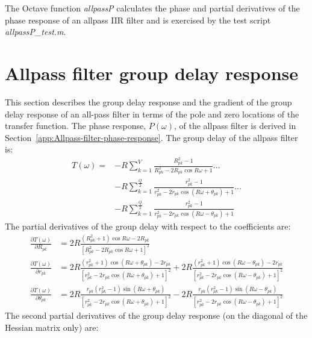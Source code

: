 \documentclass[a4paper,twoside,10pt,english]{report}
\begin{document}
The Octave function \emph{allpassP}
calculates the phase and partial derivatives of the phase response of an allpass
IIR filter and is exercised by the test script \emph{allpassP\_test.m}.
\section{\label{app:Allpass-filter-delay-response}Allpass filter group delay response}
This section describes the group delay response and the gradient of the group 
delay response of an all-pass filter in terms of the pole and zero locations of 
the transfer function. The phase response, $P\left(\omega\right)$, of the allpass
filter is derived in Section~\ref{app:Allpass-filter-phase-response}. The group
delay of the allpass filter is:
\begin{align*}
T\left(\omega\right) =
&-R\sum_{k=1}^{V}\frac{R_{pk}^{2}-1}{R_{pk}^{2}-2R_{pk}\cos R\omega+1} \hdots \\
&-R\sum_{k=1}^{\frac{Q}{2}}\frac{r_{pk}^{2}-1}
{r_{pk}^{2}-2r_{pk}\cos\left( R\omega+\theta_{pk}\right)+1} \hdots \\
&-R\sum_{k=1}^{\frac{Q}{2}}\frac{r_{pk}^{2}-1}
{r_{pk}^{2}-2r_{pk}\cos\left( R\omega-\theta_{pk}\right)+1}
\end{align*}
The partial derivatives of the group delay with respect to the coefficients are:
\begin{align*}
\frac{\partial T\left(\omega\right)}{\partial R_{pk}} &=
2R\frac{\left(R_{pk}^{2}+1\right)\cos R\omega -2R_{pk}}
{\left[R_{pk}^{2}-2R_{pk}\cos R\omega+1\right]^{2}}\\
\frac{\partial T\left(\omega\right)}{\partial r_{pk}} &=
2R\frac{\left(r_{pk}^{2}+1\right)\cos\left(R\omega+\theta_{pk}\right) -2r_{pk}}
{\left[r_{pk}^{2}-2r_{pk}\cos\left(R\omega+\theta_{pk}\right) +1\right]^{2}}+
2R\frac{\left(r_{pk}^{2}+1\right)\cos\left(R\omega-\theta_{pk}\right) -2r_{pk}}
{\left[r_{pk}^{2}-2r_{pk}\cos\left(R\omega-\theta_{pk}\right) +1\right]^{2}}\\
\frac{\partial T\left(\omega\right)}{\partial \theta_{pk}} &=
2R\frac{r_{pk}\left(r_{pk}^{2}-1\right)\sin\left(R\omega+\theta_{pk}\right)}
{\left[r_{pk}^{2}-2r_{pk}\cos\left(R\omega+\theta_{pk}\right) +1\right]^{2}}-
2R\frac{r_{pk}\left(r_{pk}^{2}-1\right)\sin\left(R\omega-\theta_{pk}\right)}
{\left[r_{pk}^{2}-2r_{pk}\cos\left(R\omega-\theta_{pk}\right) +1\right]^{2}}
\end{align*}
The second partial derivatives of the group delay response (on the diagonal
of the Hessian matrix only) are:
\end{document}
